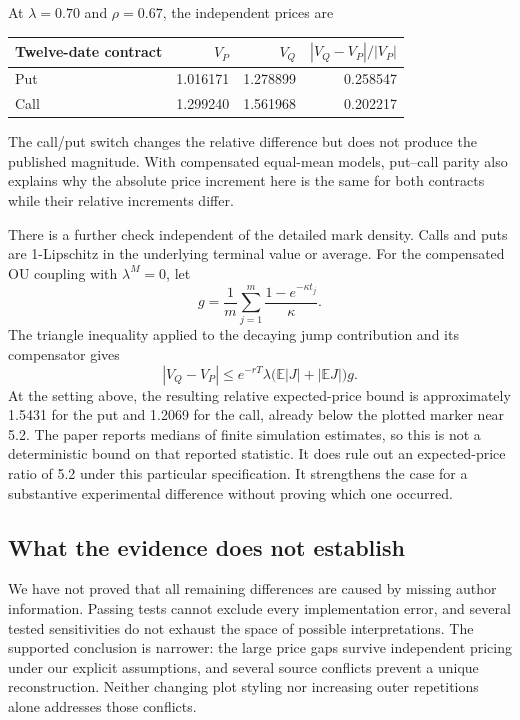 \documentclass[11pt,a4paper]{article}
\newcommand{\E}{\mathbb{E}}
\begin{document}
At $\lambda=0.70$ and $\rho=0.67$, the independent prices are
\begin{center}\small
\begin{tabular}{@{}lrrr@{}}
\toprule
Twelve-date contract & $V_P$ & $V_Q$ & $|V_Q-V_P|/|V_P|$\\
\midrule
Put & 1.016171 & 1.278899 & 0.258547\\
Call & 1.299240 & 1.561968 & 0.202217\\
\bottomrule
\end{tabular}
\end{center}
The call/put switch changes the relative difference but does not produce
the published magnitude. With compensated equal-mean models, put--call
parity also explains why the absolute price increment here is the same
for both contracts while their relative increments differ.

There is a further check independent of the detailed mark density.
Calls and puts are 1-Lipschitz in the underlying terminal value or average.
For the compensated OU coupling with $\lambda^M=0$, let
\[
g=\frac1m\sum_{j=1}^{m}\frac{1-e^{-\kappa t_j}}{\kappa}.
\]
The triangle inequality applied to the decaying jump contribution and
its compensator gives
\begin{equation}
|V_Q-V_P|\le e^{-rT}\lambda\bigl(\E|J|+|\E J|\bigr)g.
\end{equation}
At the setting above, the resulting relative expected-price bound is
approximately 1.5431 for the put and 1.2069 for the call, already below
the plotted marker near 5.2. The paper reports medians of finite
simulation estimates, so this is not a deterministic bound on that
reported statistic. It does rule out an expected-price ratio of 5.2
under this particular specification. It strengthens the case for a
substantive experimental difference without proving which one occurred.

\subsection{What the evidence does not establish}
We have not proved that all remaining differences are caused by missing
author information. Passing tests cannot exclude every implementation
error, and several tested sensitivities do not exhaust the space of
possible interpretations. The supported conclusion is narrower:
the large price gaps survive independent pricing under our explicit
assumptions, and several source conflicts prevent a unique reconstruction.
Neither changing plot styling nor increasing outer repetitions alone
addresses those conflicts.
\end{document}
